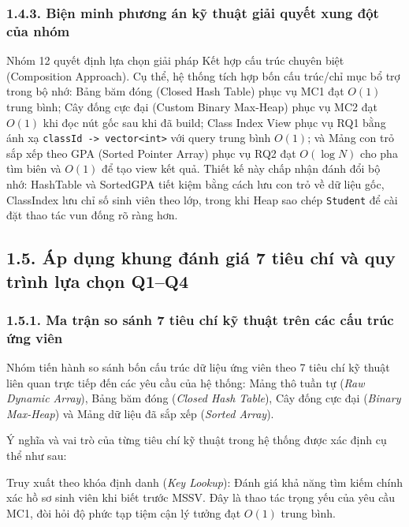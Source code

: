 \documentclass[14pt,a4paper]{extarticle}
\begin{document}
\subsubsection*{1.4.3. Biện minh phương án kỹ thuật giải quyết xung đột của nhóm}
{}

Nhóm 12 quyết định lựa chọn giải pháp Kết hợp cấu trúc chuyên biệt (Composition Approach). Cụ thể, hệ thống tích hợp bốn cấu trúc/chỉ mục bổ trợ trong bộ nhớ: Bảng băm đóng (Closed Hash Table) phục vụ MC1 đạt $O(1)$ trung bình; Cây đống cực đại (Custom Binary Max-Heap) phục vụ MC2 đạt $O(1)$ khi đọc nút gốc sau khi đã build; Class Index View phục vụ RQ1 bằng ánh xạ \texttt{classId -> vector<int>} với query trung bình $O(1)$; và Mảng con trỏ sắp xếp theo GPA (Sorted Pointer Array) phục vụ RQ2 đạt $O(\log N)$ cho pha tìm biên và $O(1)$ để tạo view kết quả. Thiết kế này chấp nhận đánh đổi bộ nhớ: HashTable và SortedGPA tiết kiệm bằng cách lưu con trỏ về dữ liệu gốc, ClassIndex lưu chỉ số sinh viên theo lớp, trong khi Heap sao chép \texttt{Student} để cài đặt thao tác vun đống rõ ràng hơn.

\subsection*{1.5. Áp dụng khung đánh giá 7 tiêu chí và quy trình lựa chọn Q1--Q4}
{}

\subsubsection*{1.5.1. Ma trận so sánh 7 tiêu chí kỹ thuật trên các cấu trúc ứng viên}
{}

Nhóm tiến hành so sánh bốn cấu trúc dữ liệu ứng viên theo 7 tiêu chí kỹ thuật liên quan trực tiếp đến các yêu cầu của hệ thống: Mảng thô tuần tự (\textit{Raw Dynamic Array}), Bảng băm đóng (\textit{Closed Hash Table}), Cây đống cực đại (\textit{Binary Max-Heap}) và Mảng dữ liệu đã sắp xếp (\textit{Sorted Array}).

Ý nghĩa và vai trò của từng tiêu chí kỹ thuật trong hệ thống được xác định cụ thể như sau:

Truy xuất theo khóa định danh (\textit{Key Lookup}): Đánh giá khả năng tìm kiếm chính xác hồ sơ sinh viên khi biết trước MSSV. Đây là thao tác trọng yếu của yêu cầu MC1, đòi hỏi độ phức tạp tiệm cận lý tưởng đạt $O(1)$ trung bình.
\end{document}
